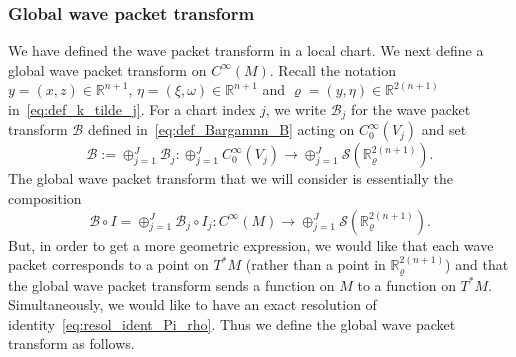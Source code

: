 \documentclass[AHL,Unicode,longabstracts,published]{cedram}
\newcommand{\clS}{\mathcal{S}}
\newcommand{\clB}{\mathcal{B}}
\newcommand{\bbR}{\mathbb{R}}
\newcommand{\bbR}{\mathbb{R}}
\begin{document}
\subsubsection{\label{subsec:Resolution-of-identity-2}
Global wave packet transform}

We have defined the wave packet transform in a local chart. We next define a global wave packet transform on $C^{\infty}(M)$. Recall the notation $y=(x,z)\in\bbR^{n+1}$, $\eta=(\xi,\omega)\in\bbR^{n+1}$ and $\varrho=(y,\eta)\in\bbR^{2(n+1)}$ in~\eqref{eq:def_k_tilde_j}. For a chart index $j$, we write $\clB_{j}$ for the wave packet transform $\clB$ defined in~\eqref{eq:def_Bargamnn_B} acting on $C_{0}^{\infty}(V_{j})$ and set
\[
\clB:=\oplus_{j=1}^{J}\clB_{j}:\oplus_{j=1}^{J}C_{0}^{\infty}(V_{j})\rightarrow\oplus_{j=1}^{J}\clS\left(\bbR_{\varrho}^{2\left(n+1\right)}\right).
\]
The global wave packet transform that we will consider is essentially the composition
\begin{equation}\label{eq:B-I}
\clB\circ I=\oplus_{j=1}^{J}\clB_{j}\circ I_{j}:C^{\infty}\left(M\right)\rightarrow\oplus_{j=1}^{J}\clS\left(\bbR_{\varrho}^{2\left(n+1\right)}\right).
\end{equation}
But, in order to get a more geometric expression, we would like that each wave packet corresponds to a point on $T^{*}M$ (rather than a point in $\bbR_{\varrho}^{2(n+1)}$) and that the global wave packet transform sends a function on $M$ to a function on $T^{*}M$. Simultaneously, we would like to have an exact resolution of identity~\eqref{eq:resol_ident_Pi_rho}. Thus we define the global wave packet transform as follows.
\end{document}
